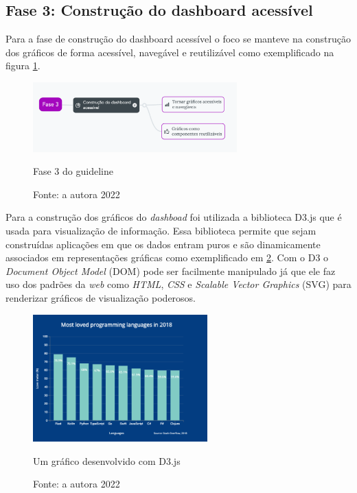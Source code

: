 \subsection{Fase 3: Construção do dashboard acessível}
{

Para a fase de construção do dashboard acessível o foco se manteve na construção dos gráficos de forma acessível, navegável e reutilizável como exemplificado na figura \ref{guideline-f3}.
\newpage

\begin{figure}[ht]
  	\center
    \includegraphics[width=0.7\textwidth]{images/guideline-f3.png}
    \caption{Fase 3 do guideline}
    \caption*{Fonte: a autora 2022}
    \label{guideline-f3}
\end{figure} 

Para a construção dos gráficos do \textit{dashboad} foi utilizada a biblioteca D3.js \cite{D3} que é usada para visualização de informação. Essa biblioteca permite que sejam construídas aplicações em que os dados entram puros e são dinamicamente associados em representações gráficas como exemplificado em \ref{graph:d3}. Com o D3 o \textit{Document Object Model} (DOM) \cite{DOM} pode ser facilmente manipulado já que ele faz uso dos padrões da \textit{web} como \textit{HTML}, \textit{CSS} e \textit{Scalable Vector Graphics} (SVG) para renderizar gráficos de visualização poderosos.

\begin{figure}[ht]
  	\center
    \includegraphics[width=0.6\textwidth]{images/exemplo-graf-d3.png}
    \caption{Um gráfico desenvolvido com D3.js}
    \caption*{Fonte: a autora 2022}
    \label{graph:d3}
\end{figure} 

}

